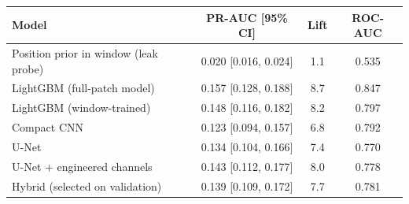 \begin{tabular}{lccc}
\toprule
Model & PR-AUC [95\% CI] & Lift & ROC-AUC \\
\midrule
Position prior in window (leak probe) & 0.020 [0.016, 0.024] & 1.1 & 0.535 \\
LightGBM (full-patch model) & 0.157 [0.128, 0.188] & 8.7 & 0.847 \\
LightGBM (window-trained) & 0.148 [0.116, 0.182] & 8.2 & 0.797 \\
Compact CNN & 0.123 [0.094, 0.157] & 6.8 & 0.792 \\
U-Net & 0.134 [0.104, 0.166] & 7.4 & 0.770 \\
U-Net + engineered channels & 0.143 [0.112, 0.177] & 8.0 & 0.778 \\
Hybrid (selected on validation) & 0.139 [0.109, 0.172] & 7.7 & 0.781 \\
\bottomrule
\end{tabular}
